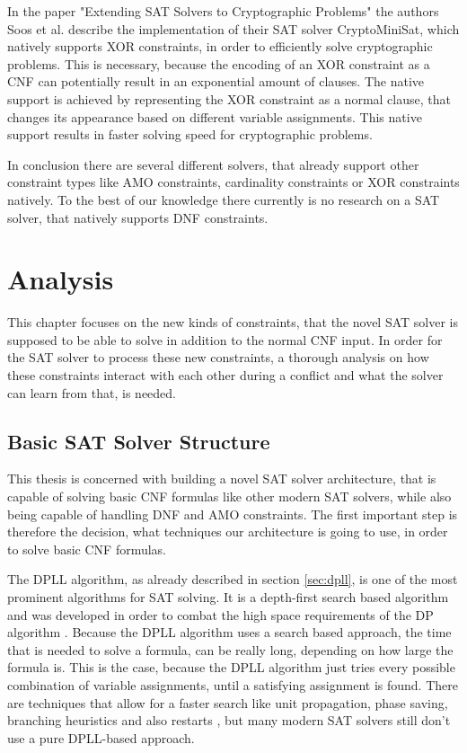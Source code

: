 In the paper "Extending SAT Solvers to Cryptographic Problems" \cite{DBLP:conf/sat/SoosNC09} the authors Soos et al. describe the implementation of their SAT solver CryptoMiniSat, which natively supports XOR constraints, in order to efficiently solve cryptographic problems. This is necessary, because the encoding of an XOR constraint as a CNF can potentially result in an exponential amount of clauses. The native support is achieved by representing the XOR constraint as a normal clause, that changes its appearance based on different variable assignments. This native support results in faster solving speed for cryptographic problems.

In conclusion there are several different solvers, that already support other constraint types like AMO constraints, cardinality constraints or XOR constraints natively. To the best of our knowledge there currently is no research on a SAT solver, that natively supports DNF constraints.

\chapter{Analysis}
\label{ch:Analysis}

This chapter focuses on the new kinds of constraints, that the novel SAT solver is supposed to be able to solve in addition to the normal CNF input. In order for the SAT solver to process these new constraints, a thorough analysis on how these constraints interact with each other during a conflict and what the solver can learn from that, is needed.

\section{Basic SAT Solver Structure}

This thesis is concerned with building a novel SAT solver architecture, that is capable of solving basic CNF formulas like other modern SAT solvers, while also being capable of handling DNF and AMO constraints. The first important step is therefore the decision, what techniques our architecture is going to use, in order to solve basic CNF formulas.

The DPLL algorithm, as already described in section \ref{sec:dpll}, is one of the most prominent algorithms for SAT solving. It is a depth-first search based algorithm and was developed in order to combat the high space requirements of the DP algorithm \cite{biere2009handbook}. Because the DPLL algorithm uses a search based approach, the time that is needed to solve a formula, can be really long, depending on how large the formula is. This is the case, because the DPLL algorithm just tries every possible combination of variable assignments, until a satisfying assignment is found. There are techniques that allow for a faster search like unit propagation, phase saving, branching heuristics and also restarts \cite{biere2009handbook}, but many modern SAT solvers still don't use a pure DPLL-based approach.

